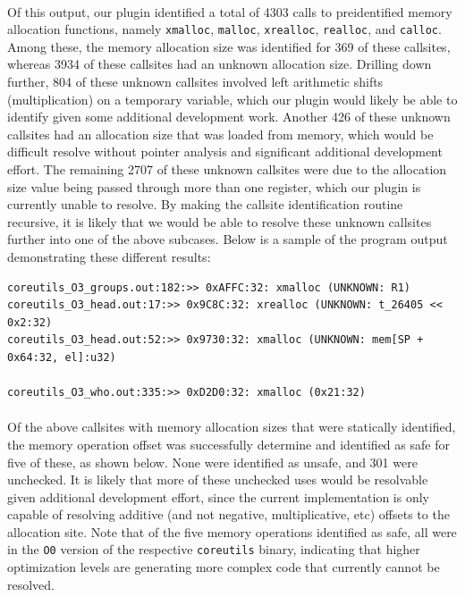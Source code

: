 \documentclass[letterpaper,11pt]{article}
\begin{document}
\paragraph{}
Of this output, our plugin identified a total of 4303 calls to preidentified
memory allocation functions, namely \texttt{xmalloc}, \texttt{malloc}, \texttt{xrealloc},
\texttt{realloc}, and \texttt{calloc}. Among these, the memory allocation size was
identified for 369 of these callsites, whereas 3934 of these callsites had an
unknown allocation size. Drilling down further, 804 of these unknown callsites
involved left arithmetic shifts (multiplication) on a temporary variable, which
our plugin would likely be able to identify given some additional development
work.  Another 426 of these unknown callsites had an allocation size that was
loaded from memory, which would be difficult resolve without pointer analysis
and significant additional development effort. The remaining 2707 of these
unknown callsites were due to the allocation size value being passed through
more than one register, which our plugin is currently unable to resolve. By
making the callsite identification routine recursive, it is likely that we
would be able to resolve these unknown callsites further into one of the above
subcases.  Below is a sample of the program output demonstrating these
different results:

\begin{verbatim}
coreutils_O3_groups.out:182:>> 0xAFFC:32: xmalloc (UNKNOWN: R1)
coreutils_O3_head.out:17:>> 0x9C8C:32: xrealloc (UNKNOWN: t_26405 << 0x2:32)
coreutils_O3_head.out:52:>> 0x9730:32: xmalloc (UNKNOWN: mem[SP + 0x64:32, el]:u32)

coreutils_O3_who.out:335:>> 0xD2D0:32: xmalloc (0x21:32)
\end{verbatim}

\paragraph{}
Of the above callsites with memory allocation sizes that were statically
identified, the memory operation offset was successfully determine and
identified as safe for five of these, as shown below. None were identified as
unsafe, and 301 were unchecked. It is likely that more of these unchecked uses
would be resolvable given additional development effort, since the current
implementation is only capable of resolving additive (and not negative,
multiplicative, etc) offsets to the allocation site. Note that of the five
memory operations identified as safe, all were in the \texttt{O0} version of the
respective \texttt{coreutils} binary, indicating that higher optimization levels are
generating more complex code that currently cannot be resolved.
\end{document}
